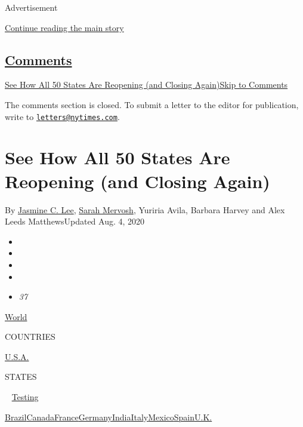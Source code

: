 Advertisement

\protect\hyperlink{after-top}{Continue reading the main story}

\hypertarget{comments}{%
\subsection{\texorpdfstring{\protect\hyperlink{commentsContainer}{Comments}}{Comments}}\label{comments}}

\href{}{See How All 50 States Are Reopening (and Closing
Again)}\href{}{Skip to Comments}

The comments section is closed. To submit a letter to the editor for
publication, write to
\href{mailto:letters@nytimes.com}{\nolinkurl{letters@nytimes.com}}.

\hypertarget{see-how-all-50-states-are-reopening-and-closing-again}{%
\section{See How All 50 States Are Reopening (and Closing
Again)}\label{see-how-all-50-states-are-reopening-and-closing-again}}

By \href{https://www.nytimes.com/by/jasmine-c-lee}{Jasmine C. Lee},
\href{https://www.nytimes.com/by/sarah-mervosh}{Sarah Mervosh}, Yuriria
Avila, Barbara Harvey and Alex Leeds MatthewsUpdated Aug. 4, 2020

\begin{itemize}
\item
\item
\item
\item
\item
  \emph{37}
\end{itemize}

\href{https://www.nytimes.com/interactive/2020/world/coronavirus-maps.html}{World}~

COUNTRIES

\textbar{}
\href{https://www.nytimes.com/interactive/2020/us/coronavirus-us-cases.html}{U.S.A.}~

STATES

~
\href{https://www.nytimes.com/interactive/2020/us/coronavirus-testing.html}{Testing}

\href{https://www.nytimes.com/interactive/2020/world/americas/brazil-coronavirus-cases.html}{Brazil}\href{https://www.nytimes.com/interactive/2020/world/canada/canada-coronavirus-cases.html}{Canada}\href{https://www.nytimes.com/interactive/2020/world/europe/france-coronavirus-cases.html}{France}\href{https://www.nytimes.com/interactive/2020/world/europe/germany-coronavirus-cases.html}{Germany}\href{https://www.nytimes.com/interactive/2020/world/asia/india-coronavirus-cases.html}{India}\href{https://www.nytimes.com/interactive/2020/world/europe/italy-coronavirus-cases.html}{Italy}\href{https://www.nytimes.com/interactive/2020/world/americas/mexico-coronavirus-cases.html}{Mexico}\href{https://www.nytimes.com/interactive/2020/world/europe/spain-coronavirus-cases.html}{Spain}\href{https://www.nytimes.com/interactive/2020/world/europe/united-kingdom-coronavirus-cases.html}{U.K.}

